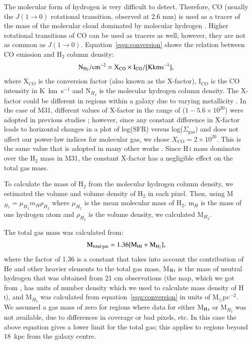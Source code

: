 The molecular form of hydrogen is very difficult to detect. Therefore, CO (usually the $J(1\rightarrow 0)$ rotational transition, observed at 2.6 mm) is used as a tracer of the mass of the molecular cloud dominated by molecular hydrogen \citep[see, for example,][]{Sanders84}. Higher rotational transitions of CO can be used as tracers as well; however, they are not as common as $J(1\rightarrow 0)$. Equation~\ref{equ:conversion} shows the relation between CO emission and H$_2$ column density:
\begin{equation}
\label{equ:conversion}
\rm N_{H_2}/\rm cm^{-2} = X_{CO} \times I_{CO}/[{\mathrm K km s^{-1}}],
\end{equation}
\noindent where X$_{CO}$ is the conversion factor (also known as the X-factor), I$_{CO}$ is the CO intensity in  K~km~s$^{-1}$ and N$_{H_2}$ is the molecular hydrogen column density. The X-factor could be different in regions within a galaxy due to varying metallicity \citep{Wilson95, Bosselli02, Bolato13}. In the case of M31, different values of X-factor in the range of ($1-5.6 \times 10^{20}$) were adopted in previous studies \citep[e.g.][]{Ford13, Bolato13, Leroy11, Bolato08, Nieten06}; however, since any constant difference in X-factor leads to horizontal changes in a plot of log(SFR) versus log($\Sigma_{\mathrm {gas}}$) and does not affect our power-law indices for molecular gas, we chose $X_{\mathrm {CO}}= 2 \times 10^{20}$. This is the same value that is adopted in many other works \citep[e.g.][]{Ford13, Smith12}. Since H\,{\textsc i} mass dominates over the H$_2$ mass in M31, the constant X-factor has a negligible effect on the total gas mass.

To calculate the mass of H$_2$ from the molecular hydrogen column density, we estimated the volume and volume density of H$_2$ in each pixel. Then, using M$_{H_2} = \mu_{H_2}m_H\rho_{H_2}$ where $ \mu_{H_2}$ is the mean molecular mass of H$_2$, m$_H$ is the mass of one hydrogen atom and $\rho_{H_2}$ is the volume density, we calculated M$_{H_2}$. 

The total gas mass was calculated from:
\begin{equation}
\label{equ:total_gas}
\rm M_{\mathrm{total \, gas}} = 1.36[M_{\mathrm H I}+M_{H_2}],
\end{equation}
\noindent where the factor of 1.36 is a constant that takes into account the contribution of He and other heavier elements to the total gas mass, M$_{\mathrm H\,{\textsc i}}$ is the mass of neutral hydrogen that was obtained from 21 cm observations (the map, which we got from \citet{Chemin09}, has units of number density which we used to calculate mass density of H\,{\textsc i}), and M$_{H_2}$ was calculated from equation~\ref{equ:conversion} in units of M$_{\odot}$pc$^{-2}$. We assumed a gas mass of zero for regions where data for  either M$_{\mathrm H\,{\textsc i}}$ or M$_{H_2}$ was not available, due to differences in coverage or bad pixels, etc. In this case the above equation gives a lower limit for the total gas; this applies to regions beyond 18~kpc from the galaxy centre.

